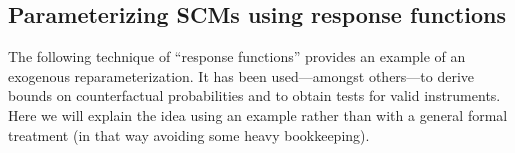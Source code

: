 \begin{Eg}
\end{Eg}


\subsection{Parameterizing SCMs using response functions}

The following technique of ``response functions'' \cite{BalkePearl1994b} provides an example of an exogenous reparameterization.
It has been used---amongst others---to derive bounds on counterfactual probabilities and to obtain tests for valid instruments.
Here we will explain the idea using an example rather than with a general formal treatment (in that way avoiding some heavy bookkeeping).


